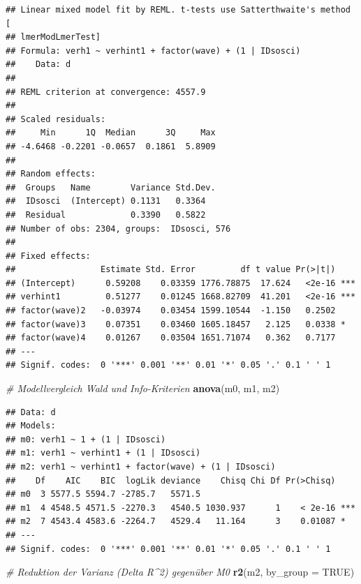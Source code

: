 \documentclass[
]{book}
\newenvironment{Shaded}{\begin{snugshade}}{\end{snugshade}}
\newcommand{\CommentTok}[1]{\textcolor[rgb]{0.56,0.35,0.01}{\textit{#1}}}
\newcommand{\DataTypeTok}[1]{\textcolor[rgb]{0.13,0.29,0.53}{#1}}
\newcommand{\KeywordTok}[1]{\textcolor[rgb]{0.13,0.29,0.53}{\textbf{#1}}}
\newcommand{\NormalTok}[1]{#1}
\newcommand{\OtherTok}[1]{\textcolor[rgb]{0.56,0.35,0.01}{#1}}
\begin{document}
\begin{verbatim}
## Linear mixed model fit by REML. t-tests use Satterthwaite's method [
## lmerModLmerTest]
## Formula: verh1 ~ verhint1 + factor(wave) + (1 | IDsosci)
##    Data: d
## 
## REML criterion at convergence: 4557.9
## 
## Scaled residuals: 
##     Min      1Q  Median      3Q     Max 
## -4.6468 -0.2201 -0.0657  0.1861  5.8909 
## 
## Random effects:
##  Groups   Name        Variance Std.Dev.
##  IDsosci  (Intercept) 0.1131   0.3364  
##  Residual             0.3390   0.5822  
## Number of obs: 2304, groups:  IDsosci, 576
## 
## Fixed effects:
##                 Estimate Std. Error         df t value Pr(>|t|)    
## (Intercept)      0.59208    0.03359 1776.78875  17.624   <2e-16 ***
## verhint1         0.51277    0.01245 1668.82709  41.201   <2e-16 ***
## factor(wave)2   -0.03974    0.03454 1599.10544  -1.150   0.2502    
## factor(wave)3    0.07351    0.03460 1605.18457   2.125   0.0338 *  
## factor(wave)4    0.01267    0.03504 1651.71074   0.362   0.7177    
## ---
## Signif. codes:  0 '***' 0.001 '**' 0.01 '*' 0.05 '.' 0.1 ' ' 1
\end{verbatim}

\begin{Shaded}
\begin{Highlighting}[]
\CommentTok{# Modellvergleich Wald und Info-Kriterien}
\KeywordTok{anova}\NormalTok{(m0, m1, m2)}
\end{Highlighting}
\end{Shaded}

\begin{verbatim}
## Data: d
## Models:
## m0: verh1 ~ 1 + (1 | IDsosci)
## m1: verh1 ~ verhint1 + (1 | IDsosci)
## m2: verh1 ~ verhint1 + factor(wave) + (1 | IDsosci)
##    Df    AIC    BIC  logLik deviance    Chisq Chi Df Pr(>Chisq)    
## m0  3 5577.5 5594.7 -2785.7   5571.5                               
## m1  4 4548.5 4571.5 -2270.3   4540.5 1030.937      1    < 2e-16 ***
## m2  7 4543.4 4583.6 -2264.7   4529.4   11.164      3    0.01087 *  
## ---
## Signif. codes:  0 '***' 0.001 '**' 0.01 '*' 0.05 '.' 0.1 ' ' 1
\end{verbatim}

\begin{Shaded}
\begin{Highlighting}[]
\CommentTok{# Reduktion der Varianz (Delta R^2) gegenüber M0}
\KeywordTok{r2}\NormalTok{(m2, }\DataTypeTok{by_group =} \OtherTok{TRUE}\NormalTok{)}
\end{Highlighting}
\end{Shaded}
\end{document}
